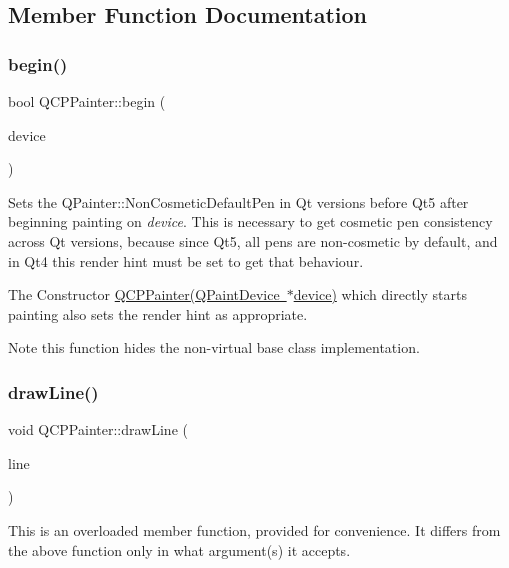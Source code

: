 \subsection{Member Function Documentation}
\mbox{\label{class_q_c_p_painter_a0a41146ccd619dceab6e25ec7b46b044}} 
\subsubsection{\texorpdfstring{begin()}{begin()}}
{\footnotesize\ttfamily bool Q\+C\+P\+Painter\+::begin (\begin{DoxyParamCaption}\item[{Q\+Paint\+Device $\ast$}]{device }\end{DoxyParamCaption})}

Sets the Q\+Painter\+::\+Non\+Cosmetic\+Default\+Pen in Qt versions before Qt5 after beginning painting on {\itshape device}. This is necessary to get cosmetic pen consistency across Qt versions, because since Qt5, all pens are non-\/cosmetic by default, and in Qt4 this render hint must be set to get that behaviour.

The Constructor \mbox{\hyperlink{class_q_c_p_painter_ae58dbb1795ddc4351ab324dc9898aa22}{Q\+C\+P\+Painter(\+Q\+Paint\+Device $\ast$device)}} which directly starts painting also sets the render hint as appropriate.

\begin{DoxyNote}{Note}
this function hides the non-\/virtual base class implementation. 
\end{DoxyNote}
\mbox{\label{class_q_c_p_painter_a0b4b1b9bd495e182c731774dc800e6e0}} 
\subsubsection{\texorpdfstring{draw\+Line()}{drawLine()}}
{\footnotesize\ttfamily void Q\+C\+P\+Painter\+::draw\+Line (\begin{DoxyParamCaption}\item[{const Q\+LineF \&}]{line }\end{DoxyParamCaption})}

This is an overloaded member function, provided for convenience. It differs from the above function only in what argument(s) it accepts.

